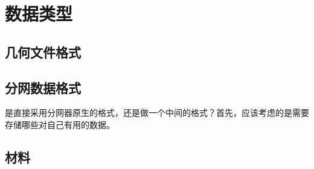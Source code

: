 \chapter{数据类型}
\section{几何文件格式}
\section{分网数据格式}
是直接采用分网器原生的格式，还是做一个中间的格式？首先，应该考虑的是需要存储哪些对自己有用的数据。
\section{材料}

